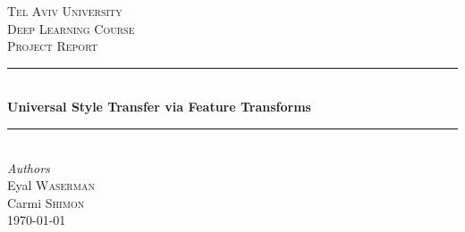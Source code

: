 \documentclass[letter,11pt]{article}
\theoremstyle{plain}
\theoremstyle{definition}
\theoremstyle{plain}
\theoremstyle{definition}
\begin{document}
	
	\begin{titlepage} %
		\newcommand{\HRule}{\rule{\linewidth}{0.5mm}} %
		
		\center %
		
		\textsc{\LARGE Tel Aviv University}\\[1.5cm] %
		\textsc{\Large Deep Learning Course}\\[0.5cm] %
		\textsc{\large Project Report}\\[0.5cm] %
		
		\HRule\\[0.4cm]
		{\LARGE\bfseries Universal Style Transfer via Feature Transforms}\\[0.4cm] %
		\HRule\\[1.5cm]
		
		{\large\textit{Authors}}\\
		Eyal \textsc{Waserman} \\%
		Carmi \textsc{Shimon} \\%
		
		
		\vfill\vfill\vfill %
		{\large\today} %
		
		
		\vfill %
		
	\end{titlepage}
	
\end{document}
